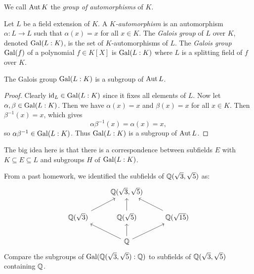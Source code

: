 \begin{definition}
  We call $\operatorname{Aut} K$ the \emph{group of automorphisms}
  of $K$.
\end{definition}

\begin{definition}
  Let $L$ be a field extension of $K$. A
  \emph{$K$-automorphism} is an automorphism
  $\alpha : L \to L$
  such that $\alpha(x) = x$ for all $x \in K$. The
  \emph{Galois group} of $L$ over $K$, denoted
  $\operatorname{Gal}(L : K)$, is the set of $K$-automorphisms of $L$.
  The \emph{Galois group} $\operatorname{Gal}(f)$ of a polynomial
  $f \in K[X]$ is $\operatorname{Gal}(L : K)$ where $L$ is a splitting
  field of $f$ over $K$.
\end{definition}

\begin{theorem}
  The Galois group $\operatorname{Gal}(L : K)$ is a subgroup of
  $\operatorname{Aut} L$.
\end{theorem}

\begin{proof}
  Clearly $\mathrm{id}_L \in \operatorname{Gal}(L : K)$ since it fixes all
  elements of $L$. Now let $\alpha, \beta \in \operatorname{Gal}(L : K)$.
  Then we have $\alpha(x) = x$ and $\beta(x) = x$ for
  all $x \in K$. Then $\beta^{-1}(x) = x$, which gives
  \[
    \alpha \beta^{-1}(x) = \alpha(x) = x,
  \]
  so $\alpha \beta^{-1} \in \operatorname{Gal}(L : K)$. Thus
  $\operatorname{Gal}(L : K)$ is a subgroup of $\operatorname{Aut} L$.
\end{proof}

\begin{remark}
  The big idea here is that there is a correspondence
  between subfields $E$ with $K \subseteq E \subseteq L$
  and subgroups $H$ of $\operatorname{Gal}(L : K)$.
\end{remark}

\begin{remark}
  From a past homework, we identified the subfields
  of $\mathbb{Q}(\sqrt{3}, \sqrt{5})$ as:
  \[
  \begin{tikzcd}
    & \Q(\sqrt{3}, \sqrt{5}) \\
    \Q(\sqrt{3}) \urar & \Q(\sqrt{5}) \uar & \Q(\sqrt{15}) \ular \\
    & \Q \ular \uar \urar
  \end{tikzcd}
  \]
  Compare the subgroups of $\operatorname{Gal}(\mathbb{Q}(\sqrt{3}, \sqrt{5}) : \mathbb{Q})$
  to subfields of $\mathbb{Q}(\sqrt{3}, \sqrt{5})$ containing
  $\mathbb{Q}$.
\end{remark}
